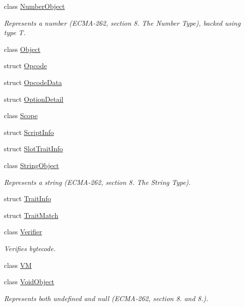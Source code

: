 \begin{DoxyCompactItemize}
\item 
class \hyperlink{classjswf_1_1avm2_1_1_number_object}{Number\+Object}
\begin{DoxyCompactList}\small\item\em Represents a number (E\+C\+M\+A-\/262, section 8. {\itshape The Number Type}), backed using type {\ttfamily T}. \end{DoxyCompactList}\item 
class \hyperlink{classjswf_1_1avm2_1_1_object}{Object}
\item 
struct \hyperlink{structjswf_1_1avm2_1_1_opcode}{Opcode}
\item 
struct \hyperlink{structjswf_1_1avm2_1_1_opcode_data}{Opcode\+Data}
\item 
struct \hyperlink{structjswf_1_1avm2_1_1_option_detail}{Option\+Detail}
\item 
class \hyperlink{classjswf_1_1avm2_1_1_scope}{Scope}
\item 
struct \hyperlink{structjswf_1_1avm2_1_1_script_info}{Script\+Info}
\item 
struct \hyperlink{structjswf_1_1avm2_1_1_slot_trait_info}{Slot\+Trait\+Info}
\item 
class \hyperlink{classjswf_1_1avm2_1_1_string_object}{String\+Object}
\begin{DoxyCompactList}\small\item\em Represents a string (E\+C\+M\+A-\/262, section 8. {\itshape The String Type}). \end{DoxyCompactList}\item 
struct \hyperlink{structjswf_1_1avm2_1_1_trait_info}{Trait\+Info}
\item 
struct \hyperlink{structjswf_1_1avm2_1_1_trait_match}{Trait\+Match}
\item 
class \hyperlink{classjswf_1_1avm2_1_1_verifier}{Verifier}
\begin{DoxyCompactList}\small\item\em Verifies bytecode. \end{DoxyCompactList}\item 
class \hyperlink{classjswf_1_1avm2_1_1_v_m}{V\+M}
\item 
class \hyperlink{classjswf_1_1avm2_1_1_void_object}{Void\+Object}
\begin{DoxyCompactList}\small\item\em Represents both {\ttfamily undefined} and {\ttfamily null} (E\+C\+M\+A-\/262, section 8. and 8.). \end{DoxyCompactList}\end{DoxyCompactItemize}
